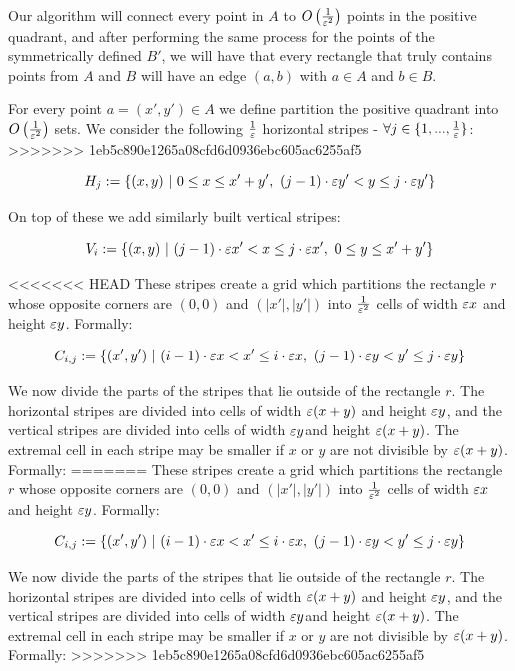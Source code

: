 \documentclass[12pt]{article}%
\begin{document}
Our algorithm will connect every point in $A$ to $O\left(\frac{1}{\varepsilon^2}\right)$ points in the positive quadrant, and after performing the same process for the points of the symmetrically defined $B'$, we will have that every rectangle that truly contains points from $A$ and $B$ will have an edge $(a,b)$ with $a\in A$ and $b\in B$.

For every point $a = (x',y') \in A$ we define partition the positive quadrant into $O\left(\frac{1}{\varepsilon^2}\right)$ sets. We consider the following $\frac{1}{\varepsilon}$ horizontal stripes - $\forall j\in \{1,...,\frac{1}{\varepsilon}\}$:
>>>>>>> 1eb5c890e1265a08cfd6d0936ebc605ac6255af5

$$H_{j}:=\{(x,y)~|~  0 \leq x \leq x'+y'  ,~ (j-1)\cdot \varepsilon y' < y \leq j\cdot \varepsilon y'\}$$

On top of these we add similarly built vertical stripes:

$$V_{i}:=\{(x,y)~|~ (j-1)\cdot \varepsilon x' < x \leq j\cdot \varepsilon x',~ 0 \leq y \leq x'+y' \}$$

<<<<<<< HEAD
These stripes create a grid which partitions the rectangle $r$ whose
opposite corners are $(0,0)$ and $(|x'|,|y'|)$ into $\frac{1}{\varepsilon^2}$
cells of width $\varepsilon x$ and height $\varepsilon y$. Formally:

$$C_{i,j}:=\{(x',y')~|~  (i-1)\cdot \varepsilon x < x' \leq i\cdot \varepsilon x,~ (j-1)\cdot \varepsilon y< y' \leq j\cdot \varepsilon y\}$$

We now divide the parts of the stripes that lie outside of the
rectangle $r$. The horizontal stripes are divided into cells of width
$\varepsilon(x+y)$ and height $\varepsilon y$, and the vertical stripes are divided
into cells of width $\varepsilon y$and height $\varepsilon(x+y)$. The extremal cell
in each stripe may be smaller if $x$ or $y$ are not divisible by
$\varepsilon(x+y)$. Formally:
=======
These stripes create a grid which partitions the rectangle $r$ whose opposite corners are $(0,0)$ and $(|x'|,|y'|)$ into $\frac{1}{\varepsilon^2}$ cells of width $\varepsilon x$ and height $\varepsilon y$. Formally:

$$C_{i,j}:=\{(x',y')~|~  (i-1)\cdot \varepsilon x < x' \leq i\cdot \varepsilon x,~ (j-1)\cdot \varepsilon y< y' \leq j\cdot \varepsilon y\}$$

We now divide the parts of the stripes that lie outside of the rectangle $r$. The horizontal stripes are divided into cells of width $\varepsilon(x+y)$ and height $\varepsilon y$, and the vertical stripes are divided into cells of width $\varepsilon y$and height $\varepsilon(x+y)$. The extremal cell in each stripe may be smaller if $x$ or $y$ are not divisible by $\varepsilon(x+y)$. Formally:
>>>>>>> 1eb5c890e1265a08cfd6d0936ebc605ac6255af5
\end{document}

